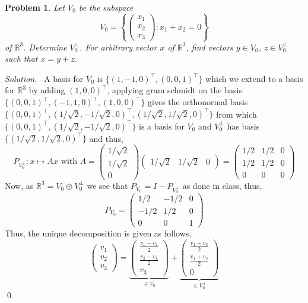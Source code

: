 \documentclass[12pt,a4paper]{article}
\newenvironment{solution}{%
  \par\noindent\textit{Solution.}\ }{\qed}
\theoremstyle{problemstyle}
\newtheorem{problem}{Problem}[section]
\def\bR{\mathbb{R}}
\begin{document}
\begin{problem}\label{prob:2-6}
Let $V_{0}$ be the subspace
$$V_{0}=\left\{\begin{pmatrix}x_{1}\\ x_{2}\\ x_{3}\end{pmatrix} : x_{1}+x_{2}=0\right\}$$
of $\mathbb{R}^{3}$. Determine $V_{0}^{\perp}$. For arbitrary vector $x$ of $\mathbb{R}^3$, find vectors $y\in V_{0}$, $z\in V_{0}^{\perp}$ such that $x=y+z$.
\end{problem}
\begin{solution}
A basis for $V_0$ is $\{(1,-1,0)^\top,(0,0,1)^\top\}$ which we extend to a
basis for $\bR^3$ by adding $(1,0,0)^\top$, applying gram schmidt on the basis
$\{(0,0,1)^\top,(-1,1,0)^\top,(1,0,0)^\top\}$ gives the orthonormal basis
$\{(0,0,1)^\top,(1/\sqrt{2},-1/\sqrt{2},0)^\top,(1/\sqrt{2},1/\sqrt{2},0)^\top\}$
from which $\{(0,0,1)^\top,(1/\sqrt{2},-1/\sqrt{2},0)^\top\}$ is a basis for
$V_0$ and $V_0^\perp$ has basis $\{(1/\sqrt{2},1/\sqrt{2},0)^\top\}$ and thus, 
$$P_{V_0^\perp}:x\mapsto Ax\text{ with } A=\begin{pmatrix}1/\sqrt{2}\\ 1/\sqrt{2}\\ 0\end{pmatrix}\begin{pmatrix}1/\sqrt{2} & 1/\sqrt{2} & 0\end{pmatrix}=\begin{pmatrix}1/2 & 1/2 & 0\\ 1/2 & 1/2 & 0\\ 0 & 0 & 0\end{pmatrix}$$
Now, as $\bR^3=V_0\oplus V_0^\perp$ we see that $P_{V_0}=I-P_{V_0^\perp}$ as done in class, thus, 
$$P_{V_0}=\begin{pmatrix}1/2 & -1/2 & 0\\ -1/2 & 1/2 & 0\\ 0 & 0 & 1\end{pmatrix}$$
Thus, the unique decomposition is given as follows,
$$\begin{pmatrix}v_1\\ v_2\\ v_3\end{pmatrix}=\underbrace{\begin{pmatrix}\frac{v_1-v_2}{2}\\ \frac{v_2-v_1}{2}\\ v_3\end{pmatrix}}_{\in V_0}+\underbrace{\begin{pmatrix}\frac{v_1+v_2}{2}\\ \frac{v_1+v_2}{2}\\ 0\end{pmatrix}}_{\in V_0^\perp}$$
\end{solution}
\end{document}
